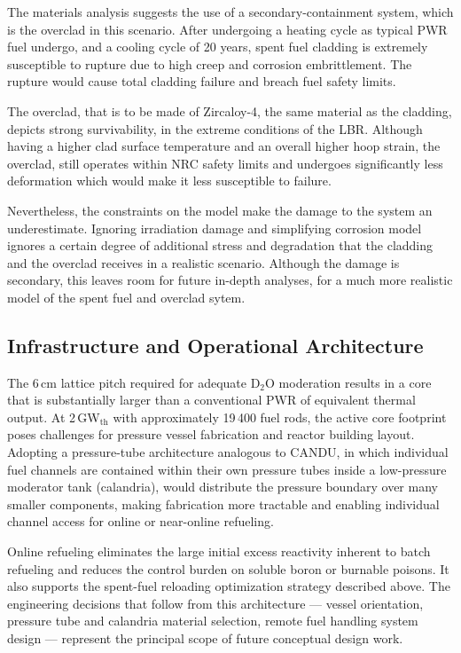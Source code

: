 The materials analysis suggests the use of a secondary-containment system, which is the overclad in this scenario. After undergoing a heating cycle as typical PWR fuel undergo, and a cooling cycle of 20 years, spent fuel cladding is extremely susceptible to rupture due to high creep and corrosion embrittlement. The rupture would cause total cladding failure and breach fuel safety limits.

The overclad, that is to be made of Zircaloy-4, the same material as the cladding, depicts strong survivability, in the extreme  conditions of the LBR. Although having a higher clad surface temperature and an overall higher hoop strain, the overclad, still operates within NRC safety limits and undergoes significantly less deformation which would make it less susceptible to failure.

Nevertheless, the constraints on the model make the damage to the system an underestimate. Ignoring irradiation damage and simplifying corrosion model ignores a certain degree of additional stress and degradation that the cladding and the overclad receives in a realistic scenario. Although the damage is secondary, this leaves room for future in-depth analyses, for a much more realistic model of the spent fuel and overclad sytem.

\subsection{Infrastructure and Operational Architecture}

The 6\,cm lattice pitch required for adequate D$_2$O moderation results in a
core that is substantially larger than a conventional PWR of equivalent
thermal output. At 2\,GW$_\text{th}$ with approximately 19\,400 fuel rods,
the active core footprint poses challenges for pressure vessel fabrication
and reactor building layout. Adopting a pressure-tube architecture analogous
to CANDU, in which individual fuel channels are contained within their own
pressure tubes inside a low-pressure moderator tank (calandria), would
distribute the pressure boundary over many smaller components, making
fabrication more tractable and enabling individual channel access for online
or near-online refueling.

Online refueling eliminates the large initial excess reactivity inherent to
batch refueling and reduces the control burden on soluble boron or burnable
poisons. It also supports the spent-fuel reloading optimization strategy
described above. The engineering decisions that follow from this architecture
--- vessel orientation, pressure tube and calandria material selection, remote
fuel handling system design --- represent the principal scope of future
conceptual design work.

